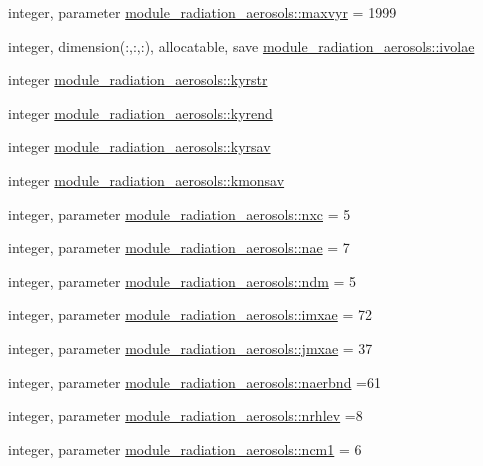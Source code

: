 \begin{DoxyCompactItemize}
\item 
integer, parameter \hyperlink{group__module__radiation__aerosols_gad856a3d564ff84043219626759673f27}{module\+\_\+radiation\+\_\+aerosols\+::maxvyr} = 1999
\item 
integer, dimension(\+:,\+:,\+:), allocatable, save \hyperlink{group__module__radiation__aerosols_gab016f51c81a1157ee234dc82f8f114ee}{module\+\_\+radiation\+\_\+aerosols\+::ivolae}
\item 
integer \hyperlink{group__module__radiation__aerosols_gaf224f7d7991e3d48aeaa4d221da50f41}{module\+\_\+radiation\+\_\+aerosols\+::kyrstr}
\item 
integer \hyperlink{group__module__radiation__aerosols_ga79127786cce93bccf8749ef8c85f6467}{module\+\_\+radiation\+\_\+aerosols\+::kyrend}
\item 
integer \hyperlink{group__module__radiation__aerosols_ga928c08857f866e4b848873a23a1d49e7}{module\+\_\+radiation\+\_\+aerosols\+::kyrsav}
\item 
integer \hyperlink{group__module__radiation__aerosols_ga302ae8a5aa2b8fb08ad366ef124cee45}{module\+\_\+radiation\+\_\+aerosols\+::kmonsav}
\item 
integer, parameter \hyperlink{group__module__radiation__aerosols_ga1fffbb55ad2986a216b721a6c103c4cf}{module\+\_\+radiation\+\_\+aerosols\+::nxc} = 5
\item 
integer, parameter \hyperlink{group__module__radiation__aerosols_ga45121ca4dcb3194e8afb4090fa810657}{module\+\_\+radiation\+\_\+aerosols\+::nae} = 7
\item 
integer, parameter \hyperlink{group__module__radiation__aerosols_gae77b22f76f193cef19b6e6c3ee8e0773}{module\+\_\+radiation\+\_\+aerosols\+::ndm} = 5
\item 
integer, parameter \hyperlink{group__module__radiation__aerosols_ga52cda855a397136f75768d205292ddbb}{module\+\_\+radiation\+\_\+aerosols\+::imxae} = 72
\item 
integer, parameter \hyperlink{group__module__radiation__aerosols_gafdfdd058364062349b02cec9c712ea80}{module\+\_\+radiation\+\_\+aerosols\+::jmxae} = 37
\item 
integer, parameter \hyperlink{group__module__radiation__aerosols_gae8ffb66e7e617f045663ce2732743b4a}{module\+\_\+radiation\+\_\+aerosols\+::naerbnd} =61
\item 
integer, parameter \hyperlink{group__module__radiation__aerosols_gaa6d18b0588e80cb40871cc75870d09ba}{module\+\_\+radiation\+\_\+aerosols\+::nrhlev} =8
\item 
integer, parameter \hyperlink{group__module__radiation__aerosols_gac6bc533a79d4b19129834cbc9a9fbc18}{module\+\_\+radiation\+\_\+aerosols\+::ncm1} = 6

\end{DoxyCompactItemize}
